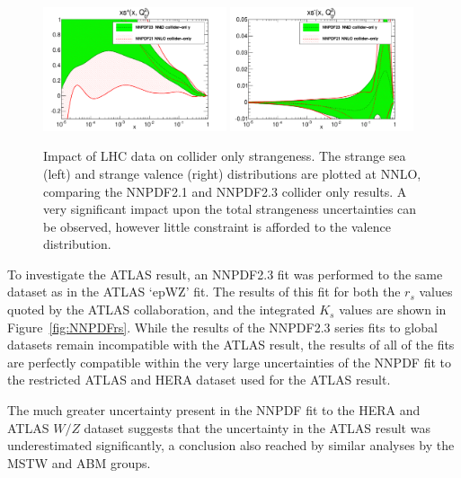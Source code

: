 \begin{figure}[ht]
\centering
\includegraphics[width=0.48\textwidth]{6-LHCimpact/figs/pdf_xsplus_log_band_comparison_coll.pdf}
\includegraphics[width=0.48\textwidth]{6-LHCimpact/figs/pdf_xsminus_log_band_comparison_coll.pdf}
\caption[Impact of LHC data on collider only strangeness]{Impact of LHC data on collider only strangeness. The strange sea (left) and strange valence (right) distributions are plotted at NNLO, comparing the NNPDF2.1 and NNPDF2.3 collider only results. A very significant impact upon the total strangeness uncertainties can be observed, however little constraint is afforded to the valence distribution.}
\label{fig:21vs23coll_strange}
\end{figure}

To investigate the ATLAS result, an NNPDF2.3 fit was performed to the same dataset as in the ATLAS `epWZ' fit. The results of this fit for both the $r_s$ values quoted by the ATLAS collaboration, and the integrated $K_s$ values are shown in Figure~\ref{fig:NNPDFrs}. While the results of the NNPDF2.3 series fits to global datasets remain incompatible with the ATLAS result, the results of all of the fits are perfectly compatible within the very large uncertainties of the NNPDF fit to the restricted ATLAS and HERA dataset used for the ATLAS result.

The much greater uncertainty present in the NNPDF fit to the HERA and ATLAS $W/Z$ dataset suggests that the uncertainty in the ATLAS result was underestimated significantly, a conclusion also reached by similar analyses by the MSTW and ABM groups\cite{Watt:2012tq,Alekhin:2014sya}.

